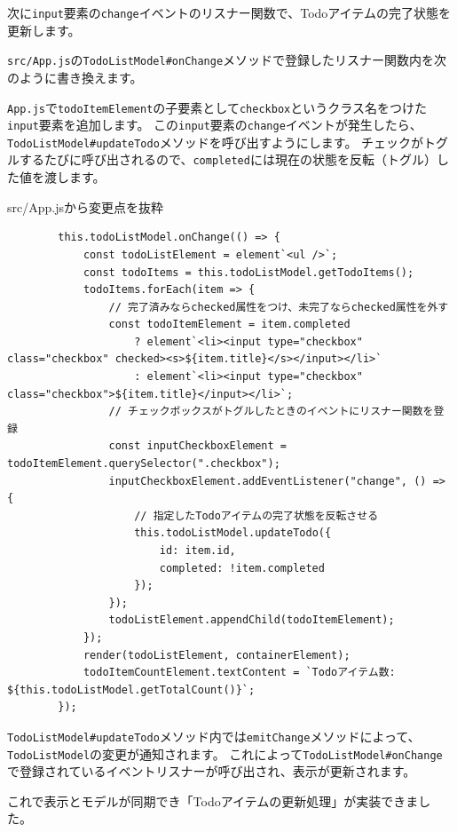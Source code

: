 次に\texttt{input}要素の\texttt{change}イベントのリスナー関数で、Todoアイテムの完了状態を更新します。

\texttt{src/App.js}の\texttt{TodoListModel\#onChange}メソッドで登録したリスナー関数内を次のように書き換えます。

\texttt{App.js}で\texttt{todoItemElement}の子要素として\texttt{checkbox}というクラス名をつけた\texttt{input}要素を追加します。
この\texttt{input}要素の\texttt{change}イベントが発生したら、\texttt{TodoListModel\#updateTodo}メソッドを呼び出すようにします。
チェックがトグルするたびに呼び出されるので、\texttt{completed}には現在の状態を反転（トグル）した値を渡します。

\begin{listtitle}
src/App.jsから変更点を抜粋
\end{listtitle}
\begin{lstlisting}
        this.todoListModel.onChange(() => {
            const todoListElement = element`<ul />`;
            const todoItems = this.todoListModel.getTodoItems();
            todoItems.forEach(item => {
                // 完了済みならchecked属性をつけ、未完了ならchecked属性を外す
                const todoItemElement = item.completed
                    ? element`<li><input type="checkbox" class="checkbox" checked><s>${item.title}</s></input></li>`
                    : element`<li><input type="checkbox" class="checkbox">${item.title}</input></li>`;
                // チェックボックスがトグルしたときのイベントにリスナー関数を登録
                const inputCheckboxElement = todoItemElement.querySelector(".checkbox");
                inputCheckboxElement.addEventListener("change", () => {
                    // 指定したTodoアイテムの完了状態を反転させる
                    this.todoListModel.updateTodo({
                        id: item.id,
                        completed: !item.completed
                    });
                });
                todoListElement.appendChild(todoItemElement);
            });
            render(todoListElement, containerElement);
            todoItemCountElement.textContent = `Todoアイテム数: ${this.todoListModel.getTotalCount()}`;
        });
\end{lstlisting}
\listend

\texttt{TodoListModel\#updateTodo}メソッド内では\texttt{emitChange}メソッドによって、\texttt{TodoListModel}の変更が通知されます。
これによって\texttt{TodoListModel\#onChange}で登録されているイベントリスナーが呼び出され、表示が更新されます。

これで表示とモデルが同期でき「Todoアイテムの更新処理」が実装できました。

